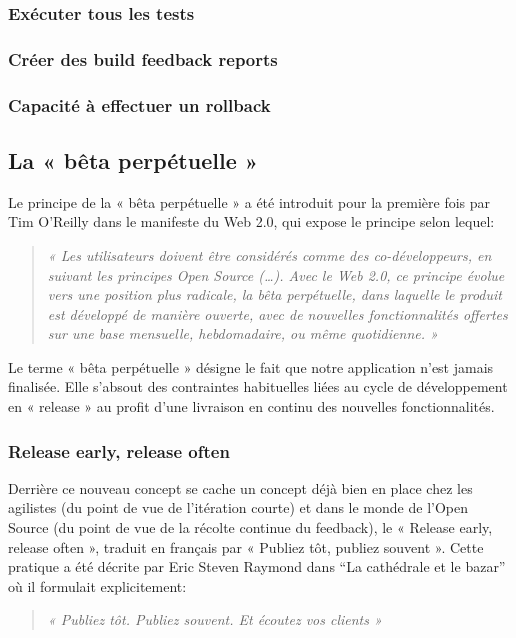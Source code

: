 \documentclass{report}
\begin{document}
        \subsubsection{Exécuter tous les tests}

        \subsubsection{Créer des build feedback reports}

        \subsubsection{Capacité à effectuer un rollback}

      \subsection{La « bêta perpétuelle »}
      Le principe de la « bêta perpétuelle » a été introduit pour la première fois par Tim O’Reilly dans le manifeste du Web 2.0, qui expose le principe selon lequel:\\
      \begin{quotation}
        \emph{« Les utilisateurs doivent être considérés comme des co-développeurs, en suivant les principes Open Source (…). Avec le Web 2.0, ce principe évolue vers une position plus radicale, la bêta perpétuelle, dans laquelle le produit est développé de manière ouverte, avec de nouvelles fonctionnalités offertes sur une base mensuelle, hebdomadaire, ou même quotidienne. »}\\
      \end{quotation}

      Le terme « bêta perpétuelle » désigne le fait que notre application n’est jamais finalisée. Elle s’absout des contraintes habituelles liées au cycle de développement en « release » au profit d’une livraison en continu des nouvelles fonctionnalités.

        \subsubsection{Release early, release often}
        Derrière ce nouveau concept se cache un concept déjà bien en place chez les agilistes (du point de vue de l’itération courte) et dans le monde de l’Open Source (du point de vue de la récolte continue du feedback), le « Release early, release often », traduit en français par « Publiez tôt, publiez souvent ». Cette pratique a été décrite par Eric Steven Raymond dans “La cathédrale et le bazar” où il formulait explicitement:\\
        \begin{quotation}
          \emph{« Publiez tôt. Publiez souvent. Et écoutez vos clients »}\\
        \end{quotation}
\end{document}
